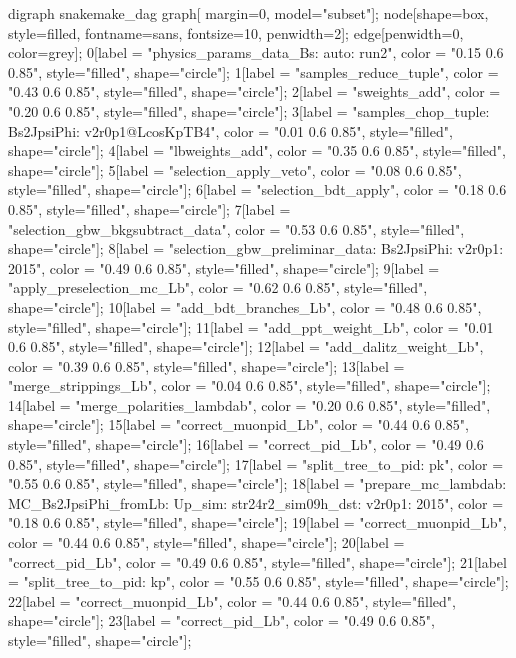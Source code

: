 digraph snakemake_dag {
    graph[ margin=0, model="subset"];
    node[shape=box, style=filled, fontname=sans,                 fontsize=10, penwidth=2];
    edge[penwidth=0, color=grey];
	0[label = "physics_params_data_Bs\nfit: auto\nyear: run2", color = "0.15 0.6 0.85", style="filled", shape="circle"];
	1[label = "samples_reduce_tuple", color = "0.43 0.6 0.85", style="filled", shape="circle"];
	2[label = "sweights_add", color = "0.20 0.6 0.85", style="filled", shape="circle"];
	3[label = "samples_chop_tuple\nmode: Bs2JpsiPhi\nversion: v2r0p1@LcosKpTB4", color = "0.01 0.6 0.85", style="filled", shape="circle"];
	4[label = "lbweights_add", color = "0.35 0.6 0.85", style="filled", shape="circle"];
	5[label = "selection_apply_veto", color = "0.08 0.6 0.85", style="filled", shape="circle"];
	6[label = "selection_bdt_apply", color = "0.18 0.6 0.85", style="filled", shape="circle"];
	7[label = "selection_gbw_bkgsubtract_data", color = "0.53 0.6 0.85", style="filled", shape="circle"];
	8[label = "selection_gbw_preliminar_data\nmode: Bs2JpsiPhi\nversion: v2r0p1\nyear: 2015", color = "0.49 0.6 0.85", style="filled", shape="circle"];
	9[label = "apply_preselection_mc_Lb", color = "0.62 0.6 0.85", style="filled", shape="circle"];
	10[label = "add_bdt_branches_Lb", color = "0.48 0.6 0.85", style="filled", shape="circle"];
	11[label = "add_ppt_weight_Lb", color = "0.01 0.6 0.85", style="filled", shape="circle"];
	12[label = "add_dalitz_weight_Lb", color = "0.39 0.6 0.85", style="filled", shape="circle"];
	13[label = "merge_strippings_Lb", color = "0.04 0.6 0.85", style="filled", shape="circle"];
	14[label = "merge_polarities_lambdab", color = "0.20 0.6 0.85", style="filled", shape="circle"];
	15[label = "correct_muonpid_Lb", color = "0.44 0.6 0.85", style="filled", shape="circle"];
	16[label = "correct_pid_Lb", color = "0.49 0.6 0.85", style="filled", shape="circle"];
	17[label = "split_tree_to_pid\npkkp: pk", color = "0.55 0.6 0.85", style="filled", shape="circle"];
	18[label = "prepare_mc_lambdab\nmode: MC_Bs2JpsiPhi_fromLb\npolarity: Up\nstrip_sim: str24r2_sim09h_dst\nversion: v2r0p1\nyear: 2015", color = "0.18 0.6 0.85", style="filled", shape="circle"];
	19[label = "correct_muonpid_Lb", color = "0.44 0.6 0.85", style="filled", shape="circle"];
	20[label = "correct_pid_Lb", color = "0.49 0.6 0.85", style="filled", shape="circle"];
	21[label = "split_tree_to_pid\npkkp: kp", color = "0.55 0.6 0.85", style="filled", shape="circle"];
	22[label = "correct_muonpid_Lb", color = "0.44 0.6 0.85", style="filled", shape="circle"];
	23[label = "correct_pid_Lb", color = "0.49 0.6 0.85", style="filled", shape="circle"];
}
